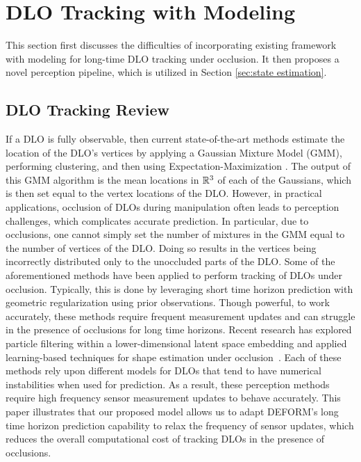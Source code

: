 \section{DLO Tracking with Modeling}
\label{appendix: DLO tracking}
This section first discusses the difficulties of incorporating existing framework with modeling for long-time DLO tracking under occlusion. 
It then proposes a novel perception pipeline, which is utilized in Section \ref{sec:state estimation}.
\subsection{DLO Tracking Review}
If a DLO is fully observable, then current state-of-the-art methods estimate the location of the DLO's vertices by applying a Gaussian Mixture Model (GMM), performing clustering, and then using Expectation-Maximization \cite{CPD, CPDwPhysics, GLTP, cdcpd, cdcpd2, SPR, Tomi1, Tomi2}.
The output of this GMM algorithm is the mean locations in $\mathbb{R}^3$ of each of the Gaussians, which is then set equal to the vertex locations of the DLO.
However, in practical applications, occlusion of DLOs during manipulation often leads to perception challenges, which complicates accurate prediction.
In particular, due to occlusions, one cannot simply set the number of mixtures in the GMM equal to the number of vertices of the DLO.
Doing so results in the vertices being incorrectly distributed only to the unoccluded parts of the DLO.
Some of the aforementioned methods\cite{cdcpd, cdcpd2} have been applied to perform tracking of DLOs under occlusion. 
Typically, this is done by leveraging short time horizon prediction with geometric regularization using prior observations. \cite{cdcpd, cdcpd2, SPR, Tomi1, Tomi2}
Though powerful, to work accurately, these methods require frequent measurement updates and can struggle in the presence of occlusions for long time horizons. 
Recent research has explored particle filtering within a lower-dimensional latent space embedding and applied learning-based techniques for shape estimation under occlusion~\cite{yang2022particle,lv2023learning}.
Each of these methods rely upon different models for DLOs that tend to have numerical instabilities when used for prediction.
As a result, these perception methods require high frequency sensor measurement updates to behave accurately.
This paper illustrates that our proposed model allows us to adapt DEFORM's long time horizon prediction capability to relax the frequency of sensor updates, which reduces the overall computational cost of tracking DLOs in the presence of occlusions. 

